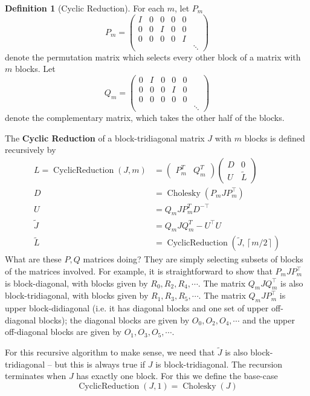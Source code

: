 \documentclass{article}
\theoremstyle{definition}
\newtheorem{definition}{Definition}
\DeclareMathOperator{\CyclicReduction}{CyclicReduction}
\DeclareMathOperator{\chol}{Cholesky}
\begin{document}
\begin{definition}[Cyclic Reduction]
For each $m$, let $P_{m}$
\[
P_{m}=\left(\begin{array}{cccccc}
I & 0 & 0 & 0 & 0\\
0 & 0 & I & 0 & 0\\
0 & 0 & 0 & 0 & I\\
 &  &  &  &  & \ddots
\end{array}\right)
\]
denote the permutation matrix which selects every other block of a
matrix with $m$ blocks. Let 
\[
Q_{m}=\left(\begin{array}{cccccc}
0 & I & 0 & 0 & 0\\
0 & 0 & 0 & I & 0\\
0 & 0 & 0 & 0 & 0\\
 &  &  &  &  & \ddots
\end{array}\right)
\]
denote the complementary matrix, which takes the other half of the
blocks.

The \textbf{Cyclic Reduction} of a block-tridiagonal matrix $J$ with $m$
blocks is defined recursively by 
\begin{align*}
L=\CyclicReduction\left(J,m\right) & =\left(\begin{array}{cc}
P_{m}^{T} & Q_{m}^{T}\end{array}\right)\left(\begin{array}{cc}
D & 0\\
U & \tilde L
\end{array}\right)\\
D & =\chol\left(P_{m}JP_{m}^{\top}\right)\\
U & =Q_{m}JP_{m}^{T}D^{-\top}\\
\tilde{J} & =Q_{m}JQ_{m}^{T}-U^{\top}U\\
\tilde{L} &= \CyclicReduction\left(\tilde{J},\left\lceil m/2\right\rceil \right)
\end{align*}
What are these $P,Q$ matrices doing?  They are simply selecting subsets of blocks of the matrices involved.  For example, it is straightforward to show that $P_m J P_m^\top$ is block-diagonal, with blocks given by $R_0,R_2,R_4,\cdots$.  The matrix $Q_m J Q_m^\top$ is also block-tridiagonal, with blocks given by $R_1,R_3,R_5,\cdots$.  The matrix $Q_m J P_m^\top$ is upper block-didiagonal (i.e. it has diagonal blocks and one set of upper off-diagonal blocks); the diagonal blocks are given by $O_0,O_2,O_4,\cdots$ and the upper off-diagonal blocks are given by $O_1,O_3,O_5,\cdots$.

For this recursive algorithm to make sense, we need that $\tilde J$ is also block-tridiagonal -- but this is always true if $J$ is block-tridiagonal.  The recursion terminates when $J$ has exactly one block.  For this we define the base-case
\[
\CyclicReduction\left(J,1\right) = \chol(J)
\]
\end{definition}
\end{document}
